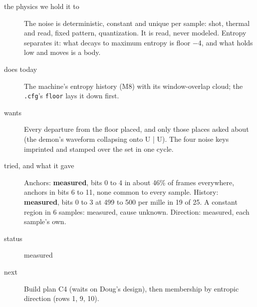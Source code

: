 \begin{description}
\item[{the physics we hold it to}] The noise is deterministic, constant and unique per sample: shot, thermal and read, fixed pattern, quantization. It is read, never modeled. Entropy separates it: what decays to maximum entropy is floor −4, and what holds low and moves is a body.
\item[{does today}] The machine's entropy history (M8) with its window-overlap cloud; the \texttt{.\allowbreak{}cfg}'s \texttt{floor} lays it down first.
\item[{wants}] Every departure from the floor placed, and only those places asked about (the demon's waveform collapsing onto U | U). The four noise keys imprinted and stamped over the set in one cycle.
\item[{tried, and what it gave}] Anchors: \textbf{measured}, bits 0 to 4 in about 46\% of frames everywhere, anchors in bits 6 to 11, none common to every sample. History: \textbf{measured}, bits 0 to 3 at 499 to 500 per mille in 19 of 25. A constant region in 6 samples: measured, cause unknown. Direction: measured, each sample's own.
\item[{status}] measured
\item[{next}] Build plan C4 (waits on Doug's design), then membership by entropic direction (rows 1, 9, 10).
\end{description}

